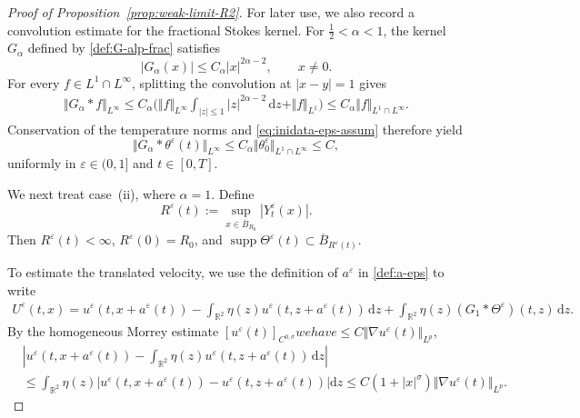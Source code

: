 \documentclass[reqno,11pt,a4paper]{amsart}
\newcommand{\dd}{\mathrm{d}}
\begin{document}
\begin{proof}[Proof of Proposition~\ref{prop:weak-limit-R2}]
For later use, we also record a convolution estimate
for the fractional Stokes kernel.
For $\frac12<\alpha<1$, the kernel $G_\alpha$
defined by \eqref{def:G-alp-frac} satisfies
\[
  |G_\alpha(x)|\leq C_\alpha|x|^{2\alpha-2},
  \qquad x\neq0.
\]
For every $f\in L^1\cap L^\infty$,
splitting the convolution at $|x-y|=1$ gives
\begin{equation}\label{eq:Galp-conv-Linf-bdd}
\begin{aligned}
  \Vert G_\alpha*f\Vert _{L^\infty}
  \leq C_\alpha
  \bigg(
    \Vert f\Vert _{L^\infty}
    \int_{|z|\leq1}|z|^{2\alpha-2}\,\dd z
    +\Vert f\Vert _{L^1}
  \bigg)
  \leq C_\alpha\Vert f\Vert _{L^1\cap L^\infty}.
\end{aligned}
\end{equation}
Conservation of the temperature norms
and \eqref{eq:inidata-eps-assum} therefore yield
\begin{equation}\label{es:Galp*the-Linf}
  \Vert G_\alpha*\theta^\varepsilon(t)\Vert _{L^\infty}
  \leq C_\alpha
    \Vert \theta_0^\varepsilon\Vert _{L^1\cap L^\infty}
  \leq C,
\end{equation}
uniformly in $\varepsilon\in(0,1]$ and $t\in[0,T]$.

We next treat case~(ii), where $\alpha=1$. Define
\[
  R^\varepsilon(t)
  :=\sup_{x\in\overline B_{R_0}}|Y_t^\varepsilon(x)|.
\]
Then $R^\varepsilon(t)<\infty$, $R^\varepsilon(0)=R_0$,
and $\operatorname{supp}\Theta^\varepsilon(t)
\subset\overline B_{R^\varepsilon(t)}$.


To estimate the translated velocity, we use the definition of $a^\varepsilon$ 
in \eqref{def:a-eps} to write
\begin{align}\label{eq:translated-velocity-decomposition}
  U^\varepsilon(t,x) = u^\varepsilon(t,x+a^\varepsilon(t))
  - \int_{\mathbb{R}^2} \eta(z)u^\varepsilon(t,z+a^\varepsilon(t))\,\dd z +
  \int_{\mathbb{R}^2} \eta(z) (G_1*\Theta^\varepsilon)(t,z)\,\dd z.
\end{align}
By the homogeneous Morrey estimate
$[u^\varepsilon(t)]_{C^{0,\sigma}} we have
\leq C\Vert \nabla u^\varepsilon(t)\Vert _{L^p}$,
\begin{equation}\label{eq:Morrey-translated}
\begin{split}
  &\left| u^\varepsilon(t,x+a^\varepsilon(t)) - \int_{\mathbb{R}^2} \eta(z)u^\varepsilon(t,z+a^\varepsilon(t))\,\dd z \right| \\
  &\leq \int_{\mathbb{R}^2} \eta(z) \left| u^\varepsilon(t,x+a^\varepsilon(t)) 
  - u^\varepsilon(t,z+a^\varepsilon(t)) \right|\dd z 
  \leq C(1+|x|^\sigma) \Vert \nabla u^\varepsilon(t)\Vert _{L^p}.
\end{split}
\end{equation}


\end{proof}
\end{document}
